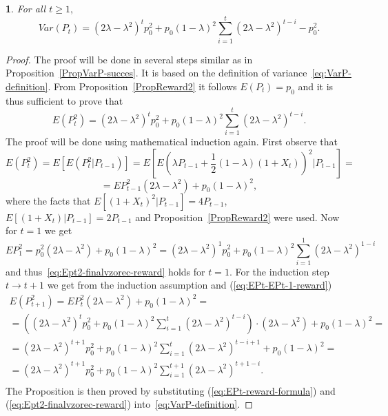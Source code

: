 \documentclass{amsart}
\theoremstyle{definition}
\theoremstyle{plain}
\newtheorem{prop}[thm]{\protect\propositionname}
\theoremstyle{plain}
\theoremstyle{plain}
\numberwithin{equation}{section}
\providecommand{\propositionname}{Proposition}
\begin{document}
    \begin{prop}
        For all $t\geq1,$
        \begin{equation}
            Var(P_{t})=(2\lambda-\lambda^{2})^{t}p_{0}^{2}+p_{0}(1-\lambda)^{2}\sum_{i=1}^{t}(2\lambda-\lambda^{2})^{t-i}-p_{0}^{2}.\label{eq:VarPt-reward-prop}
        \end{equation}
    \end{prop}
    \begin{proof}
        The proof will be done in several steps similar as in Proposition~\ref{PropVarP-succes}.
        It is based on the definition of variance~\eqref{eq:VarP-definition}.
        From Proposition~\ref{PropReward2} it follows $E(P_{t})=p_{0}$ and
        it is thus sufficient to prove that
        \begin{equation}
            E(P_{t}^{2})=(2\lambda-\lambda^{2})^{t}p_{0}^{2}+p_{0}(1-\lambda)^{2}\sum_{i=1}^{t}(2\lambda-\lambda^{2})^{t-i}.\label{eq:Ept2-finalvzorec-reward}
        \end{equation}
        The proof will be done using mathematical induction again.
        First observe that
        \[
            E(P_{t}^{2})=E[E(P_{t}^{2}|P_{t-1})]=E\left[E\left(\lambda P_{t-1}+\frac{1}{2}(1-\lambda)(1+X_{t})\right)^{2}|P_{t-1}\right]=
        \]
        \begin{equation}
            =EP_{t-1}^{2}(2\lambda-\lambda^{2})+p_{0}(1-\lambda)^{2},\label{eq:EPt-EPt-1-reward}
        \end{equation}
        where the facts that $E[(1+X_{t})^{2}|P_{t-1}]=4P_{t-1}$, $E[(1+X_{t})|P_{t-1}]=2P_{t-1}$
        and Proposition~\ref{PropReward2} were used.
        Now for $t=1$ we get
        \[
            EP_{1}^{2}=p_{0}^{2}(2\lambda-\lambda^{2})+p_{0}(1-\lambda)^{2}=(2\lambda-\lambda^{2})^{1}p_{0}^{2}+p_{0}(1-\lambda)^{2}\sum_{i=1}^{1}(2\lambda-\lambda^{2})^{1-i}
        \]
        and thus~\eqref{eq:Ept2-finalvzorec-reward} holds for $t=1$.
        For the induction step $t\rightarrow t+1$
        we get from the induction assumption and (\ref{eq:EPt-EPt-1-reward})
        \begin{gather*}
            E(P_{t+1}^{2})=EP_{t}^{2}(2\lambda-\lambda^{2})+p_{0}(1-\lambda)^{2}=\\
            =((2\lambda-\lambda^{2})^{t}p_{0}^{2}+p_{0}(1-\lambda)^{2}\sum_{i=1}^{t}(2\lambda-\lambda^{2})^{t-i})\cdot(2\lambda-\lambda^{2})+p_{0}(1-\lambda)^{2}=\\
            =(2\lambda-\lambda^{2})^{t+1}p_{0}^{2}+p_{0}(1-\lambda)^{2}\sum_{i=1}^{t}(2\lambda-\lambda^{2})^{t-i+1}+p_{0}(1-\lambda)^{2}=\\
            =(2\lambda-\lambda^{2})^{t+1}p_{0}^{2}+p_{0}(1-\lambda)^{2}\sum_{i=1}^{t+1}(2\lambda-\lambda^{2})^{t+1-i}.\\
        \end{gather*}
        The Proposition is then proved by substituting (\ref{eq:EPt-reward-formula})
        and (\ref{eq:Ept2-finalvzorec-reward}) into~\eqref{eq:VarP-definition}.
    \end{proof}
\end{document}
